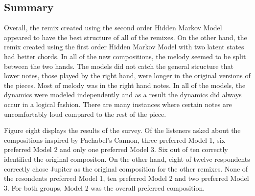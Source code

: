 \documentclass{article} %
\begin{document}
\subsection{Summary}
Overall, the remix created using the second order Hidden Markov Model appeared to have the best structure of all of the remixes. On the other hand, the remix created using the first order Hidden Markov Model with two latent states had better chords. In all of the new compositions, the melody seemed to be split between the two hands. The models did not catch the general structure that lower notes, those played by the right hand, were longer in the original versions of the pieces. Most of melody was in the right hand notes. In all of the models, the dynamics were modeled independently and as a result the dynamics did always occur in a logical fashion. There are many instances where certain notes are uncomfortably loud compared to the rest of the piece. 

Figure eight displays the results of the survey. Of the listeners asked about the compositions inspired by Pachabel's Cannon, three preferred Model 1, six preferred Model 2 and only one preferred Model 3. Six out of ten correctly identified the original compositon. On the other hand, eight of twelve respondents correctly chose Jupiter as the original composition for the other remixes. None of the resondents preferred Model 1, ten preferred Model 2 and two preferred Model 3. For both groups, Model 2 was the overall preferred composition. 
\end{document}

